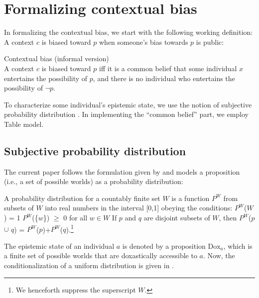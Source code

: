 \documentclass[output=paper,colorlinks,citecolor=brown]{langscibook}
\begin{document}
\section{Formalizing contextual bias}

In formalizing the contextual bias,  we start with the following working definition:
A context ${c}$ is biased toward $p$ when someone's bias  towards $p$ is public:

\ea Contextual bias  (informal version)\\
A context ${c}$ is biased toward $p$ iff
	\ea\label{entertain} it is a common belief that {some individual $x$ entertains the possibility of}  $p$, and
\ex\label{commonb}  there is no individual who entertains the possibility of $\neg p$. 
	\z
	\z

 
 To characterize some individual's epistemic state, we use the notion of subjective probability distribution \citep{Jeffrey2004, Potts, MO2007, davis2007pragmatic}.  
In implementing the ``common belief'' part, we employ  Table model.



\subsection{Subjective probability distribution}    

The current paper follows  the formulation given by \citet{davis2007pragmatic} and  models a proposition (i.e., a set of possible worlds) as  a  probability distribution:



 \ea A probability distribution for a countably finite set $W$ is a function $P^{W}$ from subsets
of $W$ into real numbers in the interval [0,1] obeying the conditions:%
\ea
$P^{W}$($W$) = 1
\ex $P^{W}$(\{$w$\}) $\geqslant$ 0 for all $w \in W$
\ex If $p$ and $q$ are disjoint
subsets of $W$, then $P^{W}$($p$ $\cup$ $q$) = $P^{W}$($p$)+$P^{W}$($q$).\footnote{We henceforth suppress the superscript $W$.}\\ 
\z
\z




 The epistemic state of an individual $a$ is denoted by a proposition $\mathrm{Dox}_a$, which is a finite set of possible worlds that are doxastically accessible to $a$.  Now, the conditionalization of a uniform distribution is given in .
\end{document}
